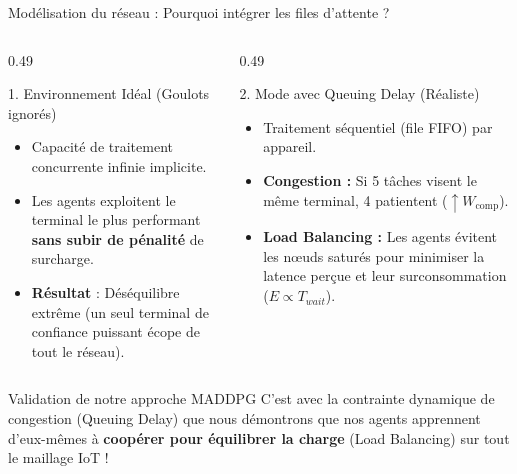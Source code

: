 \documentclass[10pt,aspectratio=169]{beamer}
\begin{document}
\begin{frame}{Modélisation du réseau : Pourquoi intégrer les files d'attente ?}

\begin{columns}[T]
\begin{column}{0.49\textwidth}
\begin{block}{1. Environnement Idéal (Goulots ignorés)}
\begin{itemize}
    \item Capacité de traitement concurrente infinie implicite.
    \item Les agents exploitent le terminal le plus performant \textbf{sans subir de pénalité} de surcharge.
    \item \textbf{Résultat} : Déséquilibre extrême (un seul terminal de confiance puissant écope de tout le réseau).
\end{itemize}
\end{block}
\end{column}

\begin{column}{0.49\textwidth}
\begin{block}{2. Mode avec Queuing Delay (Réaliste)}
\begin{itemize}
    \item Traitement séquentiel (file FIFO) par appareil.
    \item \textbf{Congestion :} Si 5 tâches visent le même terminal, 4 patientent ($\uparrow W_{\text{comp}}$).
    \item \textbf{Load Balancing :} Les agents évitent les nœuds saturés pour minimiser la latence perçue et leur surconsommation ($E \propto T_{wait}$).
\end{itemize}
\end{block}
\end{column}
\end{columns}

\bigskip
\begin{alertblock}{Validation de notre approche MADDPG}
C'est avec la contrainte dynamique de congestion (Queuing Delay) que nous démontrons que nos agents apprennent d'eux-mêmes à \textbf{coopérer pour équilibrer la charge} (Load Balancing) sur tout le maillage IoT !
\end{alertblock}

\end{frame}
\end{document}
